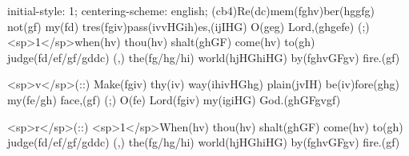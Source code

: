 initial-style: 1;
centering-scheme: english;
(cb4)Re(dc)mem(fghv)ber(hggfg) not(gf) my(fd) tres(fgiv)pass(ivvHGih)es,(ijIHG) O(geg) Lord,(ghgefe) (;) <sp>1</sp>when(hv) thou(hv) shalt(ghGF) come(hv) to(gh) judge(fd/ef/gf/gddc) (,) the(fg/hg/hi) world(hjHGhiHG) by(fghvGFgv) fire.(gf)

<sp>v</sp>(::) Make(fgiv) thy(iv) way(ihivHGhg) plain(jvIH) be(iv)fore(ghg) my(fe/gh) face,(gf) (;) O(fe) Lord(fgiv) my(igiHG) God.(ghGFgvgf)

<sp>r</sp>(::) <sp>1</sp>When(hv) thou(hv) shalt(ghGF) come(hv) to(gh) judge(fd/ef/gf/gddc) (,) the(fg/hg/hi) world(hjHGhiHG) by(fghvGFgv) fire.(gf)